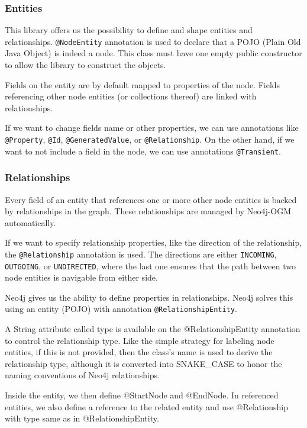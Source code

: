 \subsubsection {Entities}

This library offers us the possibility to define and shape entities and relationships. \texttt{@NodeEntity} annotation is used to declare that a POJO (Plain Old Java Object)
is indeed a node. This class must have one empty public constructor to allow the library to construct the objects.

Fields on the entity are by default mapped to properties of the node. Fields referencing other node entities (or collections thereof) are linked with relationships.

If we want to change fields name or other properties, we can use annotations like \texttt{@Property}, \texttt{@Id}, \texttt{@GeneratedValue}, or \texttt{@Relationship}. On the other hand,
if we want to not include a field in the node, we can use annotations \texttt{@Transient}.

\subsubsection {Relationships}

Every field of an entity that references one or more other node entities is backed by relationships in the graph. These relationships are managed by Neo4j-OGM automatically.

If we want to specify relationship properties, like the direction of the relationship, the \texttt{@Relationship} annotation is used. The directions are either \texttt{INCOMING},
\texttt{OUTGOING}, or \texttt{UNDIRECTED}, where the last one ensures that the path between two node entities is navigable from either side.

Neo4j gives us the ability to define properties in relationships. Neo4j solves this using an entity (POJO) with annotation \texttt{@RelationshipEntity}.

A String attribute called type is available on the @RelationshipEntity annotation to control the relationship type. Like the simple strategy for labeling node entities,
if this is not provided, then the class's name is used to derive the relationship type, although it is converted into SNAKE\_CASE to honor
the naming conventions of Neo4j relationships. \cite{noauthor_reference_nodate}

Inside the entity, we then define @StartNode and @EndNode. In referenced entities, we also define a reference to
the related entity and use @Relationship with type same as in @RelationshipEntity.


